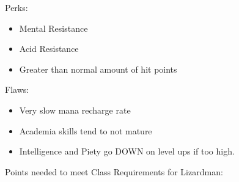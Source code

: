 \documentclass[12pt]{article}
\begin{document}
Perks:

\begin{itemize}
\item
  Mental Resistance
\item
  Acid Resistance
\item
  Greater than normal amount of hit points
\end{itemize}

Flaws:

\begin{itemize}
\item
  Very slow mana recharge rate
\item
  Academia skills tend to not mature
\item
  Intelligence and Piety go DOWN on level ups if too high.
\end{itemize}

Points needed to meet Class Requirements for Lizardman:
\end{document}
